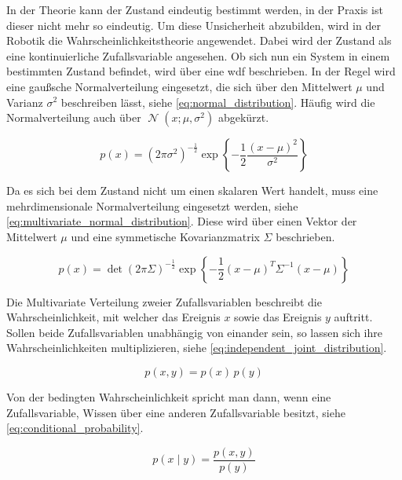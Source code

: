 In der Theorie kann der Zustand eindeutig bestimmt werden, in der Praxis ist dieser nicht mehr so eindeutig. Um diese Unsicherheit abzubilden, wird in der Robotik die Wahrscheinlichkeitstheorie angewendet. Dabei wird der Zustand als eine kontinuierliche Zufallsvariable angesehen. Ob sich nun ein System in einem bestimmten Zustand befindet, wird über eine \Gls{wdf} beschrieben. In der Regel wird eine gaußsche Normalverteilung eingesetzt, die sich über den Mittelwert $\mu$ und Varianz $\sigma^2$ beschreiben lässt, siehe \autoref{eq:normal_distribution}. Häufig wird die Normalverteilung auch über $\operatorname{\mathcal{N}}{(x; \mu, \sigma^2)}$ abgekürzt.

\begin{equation}
p(x) = \left( 2 \pi \sigma^2 \right)^{-\frac12}  \exp{ \left\{ -\frac12 \frac{(x - \mu)^2}{\sigma^2} \right\} } \label{eq:normal_distribution}
\end{equation}

Da es sich bei dem Zustand nicht um einen skalaren Wert handelt, muss eine mehrdimensionale Normalverteilung eingesetzt werden, siehe \autoref{eq:multivariate_normal_distribution}. Diese wird über einen Vektor der Mittelwert $\mu$ und eine symmetische Kovarianzmatrix $\Sigma$ beschrieben.

\begin{equation}
p(x) = \operatorname{det}{\left( 2 \pi \Sigma \right)}^{-\frac12}  \exp{ \left\{ -\frac12 (x - \mu)^T \Sigma^{-1} (x - \mu) \right\} } \label{eq:multivariate_normal_distribution}
\end{equation}

Die Multivariate Verteilung zweier Zufallsvariablen beschreibt die Wahrscheinlichkeit, mit welcher das Ereignis $x$ sowie das Ereignis $y$ auftritt. Sollen beide Zufallsvariablen unabhängig von einander sein, so lassen sich ihre Wahrscheinlichkeiten multiplizieren, siehe \autoref{eq:independent_joint_distribution}.

\begin{equation}
p(x, y) = p(x) \, p(y) \label{eq:independent_joint_distribution}
\end{equation}

Von der bedingten Wahrscheinlichkeit spricht man dann, wenn eine Zufallsvariable, Wissen über eine anderen Zufallsvariable besitzt, siehe \autoref{eq:conditional_probability}.

\begin{equation}
p(x \mid y) = \frac{p(x, y)}{p(y)} \label{eq:conditional_probability}
\end{equation}

